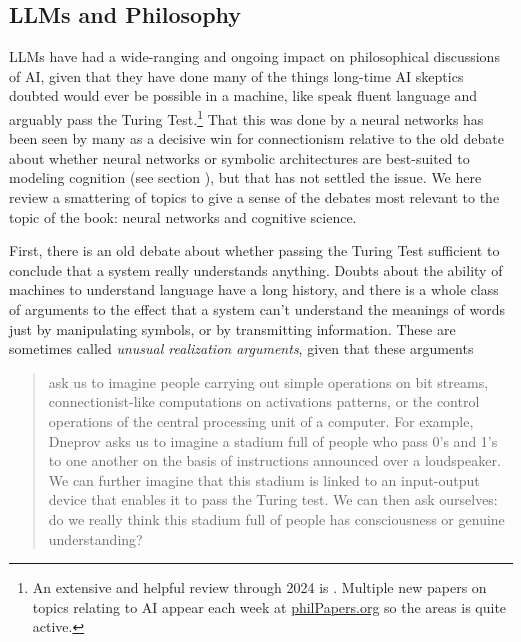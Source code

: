 \subsection{LLMs and Philosophy}\label{llmPhilosophy}

LLMs have had a wide-ranging and ongoing impact on philosophical discussions of AI, given that they have done many of the things long-time AI skeptics doubted would ever be possible in a machine, like speak fluent language and arguably pass the Turing Test.\footnote{An extensive and helpful review through 2024 is \cite{milliere2024philosophical1, milliere2024philosophical2}. Multiple new papers on topics relating to AI appear each week at \url{philPapers.org} so the areas is quite active.} That this was done by a neural networks has been seen by many as a decisive win for connectionism relative to the old debate about whether neural networks or symbolic architectures are best-suited to modeling cognition (see section ), but that has not settled the issue. We here review  a smattering of topics to give a sense of the debates most relevant to the topic of the book: neural networks and cognitive science.  


First, there is an old debate about whether passing the Turing Test sufficient to conclude that a system really understands anything. Doubts about the ability of machines to understand language have a long history, and there is a whole class of arguments to the effect that a system can’t understand the meanings of words just by manipulating symbols, or by transmitting information. These are sometimes called \emph{unusual realization arguments}, given that these arguments
\begin{quote}
ask us to imagine people carrying out simple operations on bit streams, connectionist-like computations on activations patterns, or the control operations of the central processing unit of a computer. For example, Dneprov asks us to imagine a stadium full of people who pass 0’s and 1’s to one another on the basis of instructions announced over a loudspeaker. We can further imagine that this stadium is linked to an input-output device that enables it to pass the Turing test. We can then ask ourselves: do we really think this stadium full of people has consciousness or genuine understanding? \cite{noelle2022artificial}
\end{quote}

